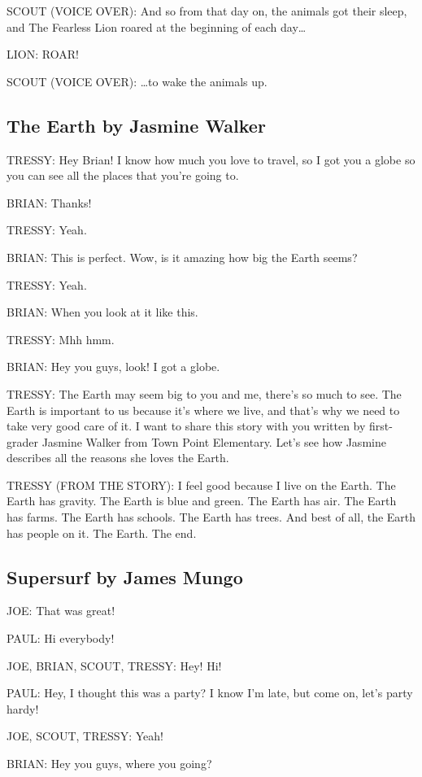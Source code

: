 SCOUT (VOICE OVER):
And so from that day on, the animals got their sleep, and The Fearless Lion roared at the beginning of each day\dots

LION:
ROAR!

SCOUT (VOICE OVER):
\dots to wake the animals up.

\subsection{The Earth by Jasmine Walker}

TRESSY:
Hey Brian!
I know how much you love to travel, so I got you a globe so you can see all the places that you're going to.

BRIAN:
Thanks!

TRESSY:
Yeah.

BRIAN:
This is perfect.
Wow, is it amazing how big the Earth seems?

TRESSY:
Yeah.

BRIAN:
When you look at it like this.

TRESSY:
Mhh hmm.

BRIAN:
Hey you guys, look!
I got a globe.

TRESSY:
The Earth may seem big to you and me, there's so much to see.
The Earth is important to us because it's where we live, and that's why we need to take very good care of it.
I want to share this story with you written by first-grader Jasmine Walker from Town Point Elementary.
Let's see how Jasmine describes all the reasons she loves the Earth.

TRESSY (FROM THE STORY):
I feel good because I live on the Earth.
The Earth has gravity.
The Earth is blue and green.
The Earth has air.
The Earth has farms.
The Earth has schools.
The Earth has trees.
And best of all, the Earth has people on it.
The Earth.
The end.

\subsection{Supersurf by James Mungo}

JOE:
That was great!

PAUL:
Hi everybody!

JOE, BRIAN, SCOUT, TRESSY:
Hey! Hi!

PAUL:
Hey, I thought this was a party?
I know I'm late, but come on, let's party hardy!

JOE, SCOUT, TRESSY:
Yeah!

BRIAN:
Hey you guys, where you going?


